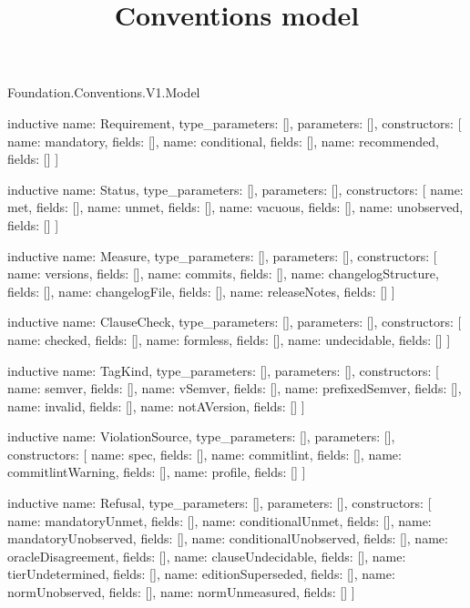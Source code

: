 \begin{lexlean}{Foundation.Conventions.V1.Model}
\title{Conventions model}
\begin{semanticmodule}
inductive{
  name: Requirement,
  type_parameters: [],
  parameters: [],
  constructors: [
    {name: mandatory, fields: []},
    {name: conditional, fields: []},
    {name: recommended, fields: []}
  ]
}

inductive{
  name: Status,
  type_parameters: [],
  parameters: [],
  constructors: [
    {name: met, fields: []},
    {name: unmet, fields: []},
    {name: vacuous, fields: []},
    {name: unobserved, fields: []}
  ]
}

inductive{
  name: Measure,
  type_parameters: [],
  parameters: [],
  constructors: [
    {name: versions, fields: []},
    {name: commits, fields: []},
    {name: changelogStructure, fields: []},
    {name: changelogFile, fields: []},
    {name: releaseNotes, fields: []}
  ]
}

inductive{
  name: ClauseCheck,
  type_parameters: [],
  parameters: [],
  constructors: [
    {name: checked, fields: []},
    {name: formless, fields: []},
    {name: undecidable, fields: []}
  ]
}

inductive{
  name: TagKind,
  type_parameters: [],
  parameters: [],
  constructors: [
    {name: semver, fields: []},
    {name: vSemver, fields: []},
    {name: prefixedSemver, fields: []},
    {name: invalid, fields: []},
    {name: notAVersion, fields: []}
  ]
}

inductive{
  name: ViolationSource,
  type_parameters: [],
  parameters: [],
  constructors: [
    {name: spec, fields: []},
    {name: commitlint, fields: []},
    {name: commitlintWarning, fields: []},
    {name: profile, fields: []}
  ]
}

inductive{
  name: Refusal,
  type_parameters: [],
  parameters: [],
  constructors: [
    {name: mandatoryUnmet, fields: []},
    {name: conditionalUnmet, fields: []},
    {name: mandatoryUnobserved, fields: []},
    {name: conditionalUnobserved, fields: []},
    {name: oracleDisagreement, fields: []},
    {name: clauseUndecidable, fields: []},
    {name: tierUndetermined, fields: []},
    {name: editionSuperseded, fields: []},
    {name: normUnobserved, fields: []},
    {name: normUnmeasured, fields: []}
  ]
}


\end{semanticmodule}
\end{lexlean}
